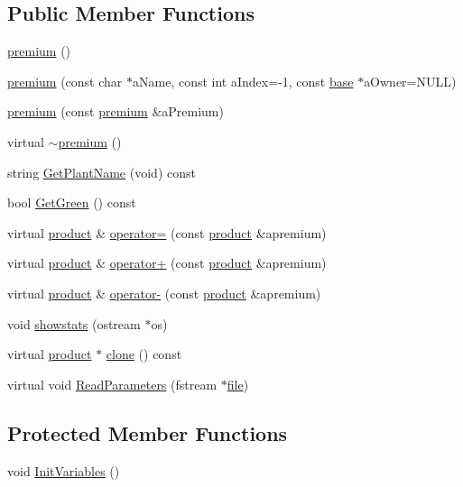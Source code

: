 \subsection*{Public Member Functions}
\begin{DoxyCompactItemize}
\item 
\hyperlink{classpremium_ac3dd91ab23baa3f55dea02cbb3bb28cd}{premium} ()
\item 
\hyperlink{classpremium_a93afafdf2e443abb3375bb079a3791c8}{premium} (const char $\ast$aName, const int aIndex=-\/1, const \hyperlink{classbase}{base} $\ast$aOwner=NULL)
\item 
\hyperlink{classpremium_a176e90d12b69d5ba258150b1acfacac4}{premium} (const \hyperlink{classpremium}{premium} \&aPremium)
\item 
virtual \hyperlink{classpremium_a09d27da0eddb03586f656c560545a15e}{$\sim$premium} ()
\item 
string \hyperlink{classpremium_a1995a83a73c5770b4ef3eb63ababb692}{GetPlantName} (void) const 
\item 
bool \hyperlink{classpremium_aec85213df0f2457aed457c3540956548}{GetGreen} () const 
\item 
virtual \hyperlink{classproduct}{product} \& \hyperlink{classpremium_af03bab06ac59b354df62a220f1052717}{operator=} (const \hyperlink{classproduct}{product} \&apremium)
\item 
virtual \hyperlink{classproduct}{product} \& \hyperlink{classpremium_ad0ec34d64c73d308689635c5619a5dba}{operator+} (const \hyperlink{classproduct}{product} \&apremium)
\item 
virtual \hyperlink{classproduct}{product} \& \hyperlink{classpremium_a2b0ea62d5e95b5655d461141e3702779}{operator-\/} (const \hyperlink{classproduct}{product} \&apremium)
\item 
void \hyperlink{classpremium_a69f4bbe9223ea34bddbe6db348670338}{showstats} (ostream $\ast$os)
\item 
virtual \hyperlink{classproduct}{product} $\ast$ \hyperlink{classpremium_aa8167e20347089e9037fcba95f4fe435}{clone} () const 
\item 
virtual void \hyperlink{classpremium_a2c3bdadfb21fa893c4cd2e2f183edcd3}{ReadParameters} (fstream $\ast$\hyperlink{classbase_a3af52ee9891719d09b8b19b42450b6f6}{file})
\end{DoxyCompactItemize}
\subsection*{Protected Member Functions}
\begin{DoxyCompactItemize}
\item 
void \hyperlink{classpremium_a18e6e7832622598ea24cb385a78f3a50}{InitVariables} ()
\end{DoxyCompactItemize}
